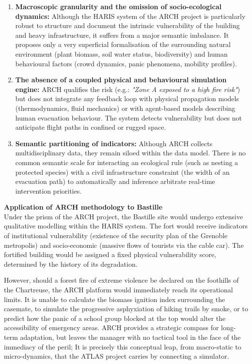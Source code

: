 \documentclass{article}
\begin{document}
\begin{enumerate}
\item \textbf {Macroscopic granularity and the omission of socio-ecological dynamics:} Although the HARIS system of the ARCH project is particularly robust to structure and document the intrinsic vulnerability of the building and heavy infrastructure, it suffers from a major semantic imbalance. It proposes only a very superficial formalisation of the surrounding natural environment (plant biomass, soil water status, biodiversity) and human behavioural factors (crowd dynamics, panic phenomena, mobility profiles).
\item \textbf {The absence of a coupled physical and behavioural simulation engine:} ARCH qualifies the risk (e.g.: \textit{"Zone A exposed to a high fire risk"}) but does not integrate any feedback loop with physical propagation models (thermodynamics, fluid mechanics) or with agent-based models describing human evacuation behaviour. The system detects vulnerability but does not anticipate flight paths in confined or rugged space.
\item \textbf {Semantic partitioning of indicators: } Although ARCH collects multidisciplinary data, they remain siloed within the data model. There is no common semantic scale for interacting an ecological rule (such as nesting a protected species) with a civil infrastructure constraint (the width of an evacuation path) to automatically and inference arbitrate real-time intervention priorities.
\end{enumerate}
\begin{filrouge}
\textbf{Application of ARCH methodology to Bastille} \\
Under the prism of the ARCH project, the Bastille site would undergo extensive qualitative modelling within the HARIS system. The fort would receive indicators of institutional vulnerability (existence of the security plan of the Grenoble metropolis) and socio-economic (massive flows of tourists via the cable car). The fortified building would be assigned a fixed physical vulnerability score, determined by the history of its degradation.

However, should a forest fire of extreme violence be declared on the foothills of the Chartreuse, the ARCH platform would immediately reach its operational limits. It is unable to calculate the biomass ignition index surrounding the casemate, to simulate the progressive asphyxiation of hiking trails by smoke, or to predict how the panic of a school group blocked at the top would alter the accessibility of emergency areas. ARCH provides a strategic compass for long-term adaptation, but leaves the manager with no tactical tool in the face of the immediacy of the peril; It is precisely this conceptual leap, from macro-static to micro-dynamics, that the ATLAS project carries by connecting a simulator.
\end{filrouge}
\end{document}
